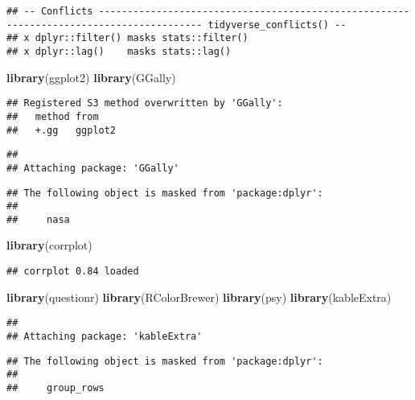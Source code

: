 \documentclass[]{article}
\newenvironment{Shaded}{\begin{snugshade}}{\end{snugshade}}
\newcommand{\KeywordTok}[1]{\textcolor[rgb]{0.13,0.29,0.53}{\textbf{#1}}}
\newcommand{\NormalTok}[1]{#1}
\begin{document}
\begin{verbatim}
## -- Conflicts ---------------------------------------------------------------------------------------- tidyverse_conflicts() --
## x dplyr::filter() masks stats::filter()
## x dplyr::lag()    masks stats::lag()
\end{verbatim}

\begin{Shaded}
\begin{Highlighting}[]
\KeywordTok{library}\NormalTok{(ggplot2)}
\KeywordTok{library}\NormalTok{(GGally)}
\end{Highlighting}
\end{Shaded}

\begin{verbatim}
## Registered S3 method overwritten by 'GGally':
##   method from   
##   +.gg   ggplot2
\end{verbatim}

\begin{verbatim}
## 
## Attaching package: 'GGally'
\end{verbatim}

\begin{verbatim}
## The following object is masked from 'package:dplyr':
## 
##     nasa
\end{verbatim}

\begin{Shaded}
\begin{Highlighting}[]
\KeywordTok{library}\NormalTok{(corrplot)}
\end{Highlighting}
\end{Shaded}

\begin{verbatim}
## corrplot 0.84 loaded
\end{verbatim}

\begin{Shaded}
\begin{Highlighting}[]
\KeywordTok{library}\NormalTok{(questionr)}
\KeywordTok{library}\NormalTok{(RColorBrewer)}
\KeywordTok{library}\NormalTok{(psy)}
\KeywordTok{library}\NormalTok{(kableExtra)}
\end{Highlighting}
\end{Shaded}

\begin{verbatim}
## 
## Attaching package: 'kableExtra'
\end{verbatim}

\begin{verbatim}
## The following object is masked from 'package:dplyr':
## 
##     group_rows
\end{verbatim}
\end{document}
